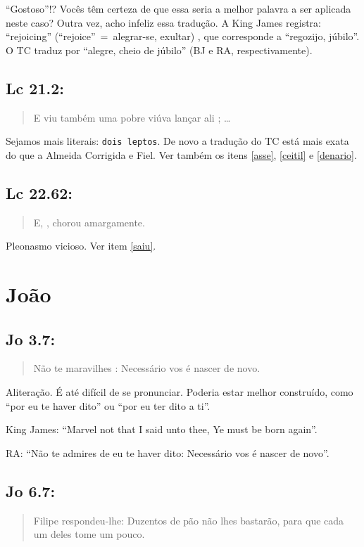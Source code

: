 ``Gostoso''!? Vocês têm certeza de que essa seria a melhor palavra a
ser aplicada neste caso? Outra vez, acho infeliz essa tradução. A King
James registra: ``rejoicing'' (``rejoice''~=~alegrar-se, exultar) ,
que corresponde a ``regozijo, júbilo''. O TC traduz por ``alegre,
cheio de júbilo'' (BJ e RA, respectivamente).

\subsection{Lc 21.2:}
\begin{quote}
    \small
E viu também uma pobre viúva lançar ali ; \ldots
\end{quote}

Sejamos mais literais: \texttt{dois leptos}. De novo a tradução do TC está mais exata do que a Almeida Corrigida e Fiel. Ver também os itens \ref{asse}, \ref{ceitil} e \ref{denario}.


\subsection{Lc 22.62:}
\begin{quote}
    \small
E, , chorou amargamente.
\end{quote}

Pleonasmo vicioso. Ver item \ref{saiu}.

\section{João}
\subsection{Jo 3.7:}
\begin{quote}
    \small
Não te maravilhes : Necessário vos é nascer de novo.
\end{quote}

Aliteração. É até difícil de se pronunciar. Poderia estar melhor
construído, como ``por eu te haver dito'' ou ``por eu ter dito a ti''.

King James: ``Marvel not that I said unto thee, Ye must be born again''.

RA: ``Não te admires de eu te haver dito: Necessário vos é nascer de novo''.

\subsection{Jo 6.7:}
\begin{quote}
    \small
Filipe respondeu-lhe: Duzentos  de pão não
lhes bastarão, para que cada um deles tome um pouco.
\end{quote}

